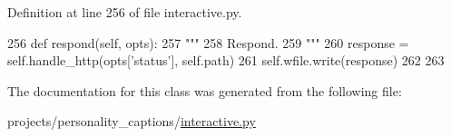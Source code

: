 Definition at line 256 of file interactive.\+py.


\begin{DoxyCode}
256     \textcolor{keyword}{def }respond(self, opts):
257         \textcolor{stringliteral}{"""}
258 \textcolor{stringliteral}{        Respond.}
259 \textcolor{stringliteral}{        """}
260         response = self.handle\_http(opts[\textcolor{stringliteral}{'status'}], self.path)
261         self.wfile.write(response)
262 
263 
\end{DoxyCode}


The documentation for this class was generated from the following file\+:\begin{DoxyCompactItemize}
\item 
projects/personality\+\_\+captions/\hyperlink{projects_2personality__captions_2interactive_8py}{interactive.\+py}\end{DoxyCompactItemize}
